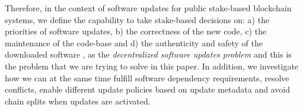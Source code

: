 Therefore, in the context of software updates for public stake-based blockchain systems, we define the capability to take stake-based decisions 
 on: a) the priorities of software updates, b) the correctness of the new code, c) the maintenance of the code-base and d) the authenticity and safety of the downloaded software
, as the \emph{decentralized software updates problem} and this is the problem that we are trying to solve in this paper. In addition, we investigate how we can at the same time fulfill software dependency requirements, resolve conflicts, enable different update policies based on update metadata and avoid chain splits when updates are activated.



